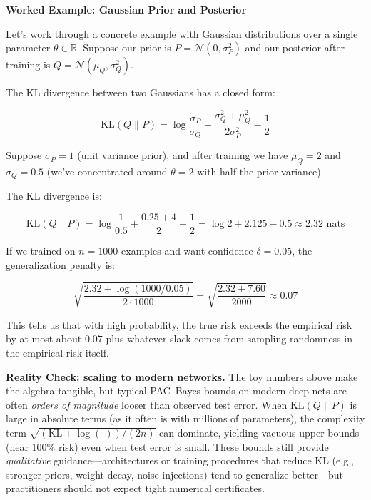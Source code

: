 \begin{examplebox}
\textbf{Worked Example: Gaussian Prior and Posterior}

Let's work through a concrete example with Gaussian distributions over a single parameter $\theta \in \mathbb{R}$. Suppose our prior is $P = \mathcal{N}(0, \sigma_P^2)$ and our posterior after training is $Q = \mathcal{N}(\mu_Q, \sigma_Q^2)$.

The KL divergence between two Gaussians has a closed form:

\begin{equation}
\text{KL}(Q \| P) = \log \frac{\sigma_P}{\sigma_Q} + \frac{\sigma_Q^2 + \mu_Q^2}{2\sigma_P^2} - \frac{1}{2}
\end{equation}

Suppose $\sigma_P = 1$ (unit variance prior), and after training we have $\mu_Q = 2$ and $\sigma_Q = 0.5$ (we've concentrated around $\theta = 2$ with half the prior variance).

The KL divergence is:

\begin{equation}
\text{KL}(Q \| P) = \log \frac{1}{0.5} + \frac{0.25 + 4}{2} - \frac{1}{2} = \log 2 + 2.125 - 0.5 \approx 2.32 \text{ nats}
\end{equation}

If we trained on $n = 1000$ examples and want confidence $\delta = 0.05$, the generalization penalty is:

\begin{equation}
\sqrt{\frac{2.32 + \log(1000/0.05)}{2 \cdot 1000}} = \sqrt{\frac{2.32 + 7.60}{2000}} \approx 0.07
\end{equation}

This tells us that with high probability, the true risk exceeds the empirical risk by at most about $0.07$ plus whatever slack comes from sampling randomness in the empirical risk itself.
\end{examplebox}

\vspace{1.5em}
\begin{pausebox}
\textbf{Reality Check: scaling to modern networks.}
The toy numbers above make the algebra tangible, but typical PAC--Bayes bounds on modern deep nets are often \emph{orders of magnitude} looser than observed test error.
When $\text{KL}(Q\|P)$ is large in absolute terms (as it often is with millions of parameters), the complexity term
$\sqrt{(\text{KL} + \log(\cdot))/(2n)}$ can dominate, yielding vacuous upper bounds (near $100\%$ risk) even when test error is small.
These bounds still provide \emph{qualitative} guidance---architectures or training procedures that reduce KL (e.g., stronger priors, weight decay, noise injections) tend to generalize better---but practitioners should not expect tight numerical certificates.
\end{pausebox}

